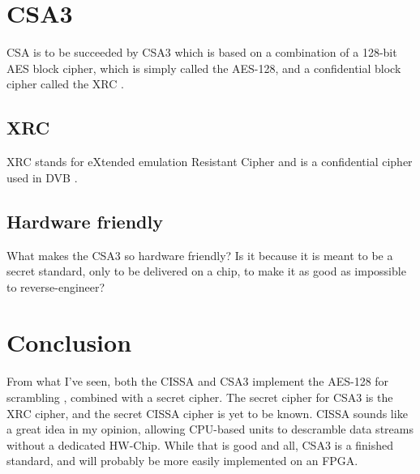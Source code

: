 \section{CSA3}
CSA is to be succeeded by CSA3 which is based on a combination of a 128-bit 
AES block cipher, which is simply called the AES-128, and a confidential block 
cipher called the XRC \citep[p. 8]{DVB:2013}.

\subsection{XRC}
XRC stands for eXtended emulation Resistant Cipher and is a confidential cipher 
used in DVB \citep[p. 8]{DVB:2013}.

\subsection{Hardware friendly}
What makes the CSA3 so hardware friendly?
Is it because it is meant to be a secret standard, only to be delivered
on a chip, to make it as good as impossible to reverse-engineer?

\section{Conclusion}
From what I've seen, both the CISSA and CSA3 implement the AES-128 for scrambling
, combined with a secret cipher. The secret cipher for CSA3 is the XRC cipher, 
and the secret CISSA cipher is yet to be known. CISSA sounds like a great idea 
in my opinion, allowing CPU-based units to descramble data streams without a 
dedicated HW-Chip. While that is good and all, CSA3 is a finished standard, and 
will probably be more easily implemented on an FPGA.
